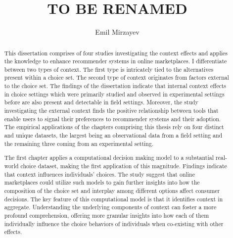 \documentclass[a4paper,12pt]{article}
\title{{\bf \Large TO BE RENAMED}
}
\author{Emil Mirzayev}
\begin{document}
\maketitle

\begin{abstract}

    This dissertation comprises of four studies investigating the context effects and applies the knowledge to enhance recommender systems in online marketplaces. I differentiate between two types of context. The first type is intricately tied to the alternatives present within a choice set. The second type of context originates from factors external to the choice set. The findings of the dissertation indicate that internal context effects in choice settings which were primarily studied and observed in experimental settings before are also present and detectable in field settings. Moreover, the study investigating the external context finds the positive relationship between tools that enable users to signal their preferences to recommender systems and their adoption. The empirical applications of the chapters comprising this thesis rely on four distinct and unique datasets, the largest being an observational data from a field setting and the remaining three coming from an experimental setting.

    The first chapter applies a computational decision making model to a substantial real-world choice dataset, making the first application of this magnitude. Findings indicate that context influences individuals' choices. The study suggest that online marketplaces could utilize such models to gain further insights into how the composition of the choice set and interplay among different options affect consumer decisions. The key feature of this computational model is that it identifies context in aggregate. Understanding the underlying components of context can foster a more profound comprehension, offering more granular insights into how each of them individually influence the choice behaviors of individuals when co-existing with other effects.


\end{abstract}
\end{document}
